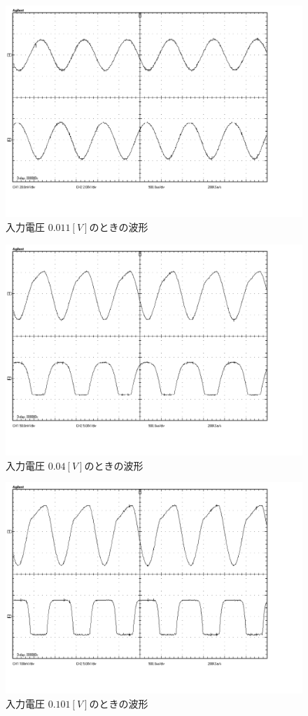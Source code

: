 \documentclass[10pt, a4j, dvipdfmx]{jarticle}
\begin{document}
    \begin{figure}[H]
        \centering
        \includegraphics[height=80mm]{ex-12.bmp}
        \caption{入力電圧 $0.011[V]$のときの波形}
        \label{ex:12}
    \end{figure}
    \begin{figure}[H]
        \centering
        \includegraphics[height=80mm]{ex-13.bmp}
        \caption{入力電圧 $0.04[V]$のときの波形}
        \label{ex:13}
    \end{figure}
    \begin{figure}[H]
        \centering
        \includegraphics[height=80mm]{ex-14.bmp}
        \caption{入力電圧 $0.101[V]$のときの波形}
        \label{ex:14}
    \end{figure}
\end{document}
